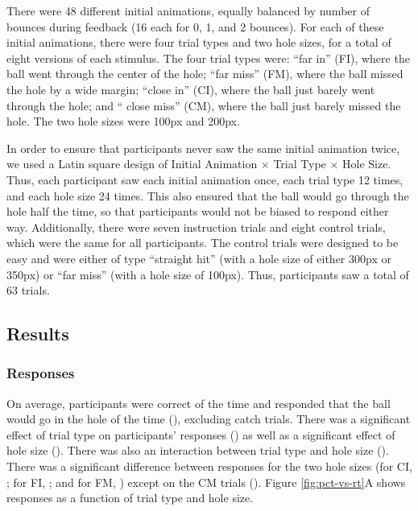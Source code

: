 \documentclass[10pt,letterpaper]{article}
\begin{document}
There were 48 different initial animations, equally balanced by number of bounces during feedback (16 each for 0, 1, and 2 bounces). 
For each of these initial animations, there were four trial types and two hole sizes, for a total of eight versions of each stimulus. 
The four trial types were: ``far in'' (FI), where the ball went through the center of the hole; ``far miss'' (FM), where the ball missed the hole by a wide margin; ``close in'' (CI), where the ball just barely went through the hole; and `` close miss'' (CM), where the ball just barely missed the hole. 
The two hole sizes were 100px and 200px.

In order to ensure that participants never saw the same initial animation twice, we used a Latin square design of Initial Animation $\times$ Trial Type $\times$ Hole Size.
Thus, each participant saw each initial animation once, each trial type 12 times, and each hole size 24 times.
This also ensured that the ball would go through the hole half the time, so that participants would not be biased to respond either way.
Additionally, there were seven instruction trials and eight control trials, which were the same for all participants.
The control trials were designed to be easy and were either of type ``straight hit'' (with a hole size of either 300px or 350px) or ``far miss'' (with a hole size of 100px).
Thus, participants saw a total of 63 trials.

\subsection{Results}

\subsubsection{Responses}

On average, participants were correct \AvgCorrect{} of the time and responded that the ball would go in the hole \AvgResponse{} of the time (\ResponseN{}), excluding catch trials.
There was a significant effect of trial type on participants' responses (\ResponseHoleClass{}) as well as a significant effect of hole size (\ResponseHoleSize{}).
There was also an interaction between trial type and hole size (\ResponseFull{}).
There was a significant difference between responses for the two hole sizes (for CI, \ResponseCIttest{}; for FI, \ResponseCIttest{}; and for FM, \ResponseFMttest{}) except on the CM trials (\ResponseCMttest{}).
Figure \ref{fig:pct-vs-rt}A shows responses as a function of trial type and hole size.
\end{document}
